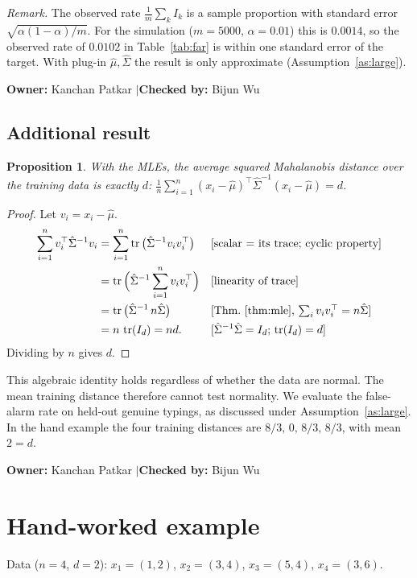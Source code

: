 \documentclass[11pt]{article}
\newtheorem{proposition}[theorem]{Proposition}
\theoremstyle{definition}
\newcommand{\T}{^{\top}}
\newcommand{\tr}{\operatorname{tr}}
\newcommand{\rul}[1]{\text{[#1]}}
\newcommand{\owner}[2]{\par\medskip\noindent\textbf{Owner:} #1 \quad$|$\quad \textbf{Checked by:} #2\par\medskip}
\begin{document}
\noindent\textit{Remark.} The observed rate $\frac1m\sum_k I_k$ is a sample proportion with standard error $\sqrt{\alpha(1-\alpha)/m}$. For the simulation ($m=5000$, $\alpha=0.01$) this is $0.0014$, so the observed rate of $0.0102$ in Table~\ref{tab:far} is within one standard error of the target. With plug-in $\hat\mu,\hat\Sigma$ the result is only approximate (Assumption~\ref{as:large}).
\owner{Kanchan Patkar}{Bijun Wu}

\subsection*{Additional result}
\begin{proposition}\label{prop:meand}
With the MLEs, the average squared Mahalanobis distance over the training data is exactly $d$:
$\frac1n\sum_{i=1}^n(x_i-\hat\mu)\T\hat\Sigma^{-1}(x_i-\hat\mu)=d$.
\end{proposition}

\begin{proof}
Let $v_i=x_i-\hat\mu$.
\begin{align*}
\sum_{i=1}^n v_i\T\hat\Sigma^{-1}v_i &= \sum_{i=1}^n\tr\big(\hat\Sigma^{-1}v_iv_i\T\big) && \rul{scalar $=$ its trace; cyclic property}\\
&= \tr\Big(\hat\Sigma^{-1}\sum_{i=1}^n v_iv_i\T\Big) && \rul{linearity of trace}\\
&= \tr\big(\hat\Sigma^{-1}\,n\hat\Sigma\big) && \rul{Thm.~\ref{thm:mle}, $\textstyle\sum_i v_iv_i\T=n\hat\Sigma$}\\
&= n\,\tr(I_d)=nd. && \rul{$\hat\Sigma^{-1}\hat\Sigma=I_d$; $\tr(I_d)=d$}
\end{align*}
Dividing by $n$ gives $d$.
\end{proof}

\noindent This algebraic identity holds regardless of whether the data are normal. The mean training distance therefore cannot test normality. We evaluate the false-alarm rate on held-out genuine typings, as discussed under Assumption~\ref{as:large}. In the hand example the four training distances are $8/3,\,0,\,8/3,\,8/3$, with mean $2=d$.
\owner{Kanchan Patkar}{Bijun Wu}

\section{Hand-worked example}\label{sec:hand}
Data ($n=4$, $d=2$): $x_1=(1,2)$, $x_2=(3,4)$, $x_3=(5,4)$, $x_4=(3,6)$.
\end{document}
